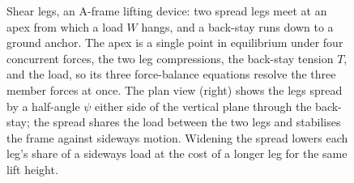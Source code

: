 \begin{figure}[htbp]
\caption[Shear legs as a three-dimensional joint]{Shear legs, an A-frame
lifting device: two spread legs meet at an apex from which a load $W$ hangs,
and a back-stay runs down to a ground anchor. The apex is a single point in
equilibrium under four concurrent forces, the two leg compressions, the
back-stay tension $T$, and the load, so its three force-balance equations
resolve the three member forces at once. The plan view (right) shows the legs
spread by a half-angle $\psi$ either side of the vertical plane through the
back-stay; the spread shares the load between the two legs and stabilises the
frame against sideways motion. Widening the spread lowers each leg's share of
a sideways load at the cost of a longer leg for the same lift height.}
\label{fig:vol03ch02:shear-legs}
\end{figure}

